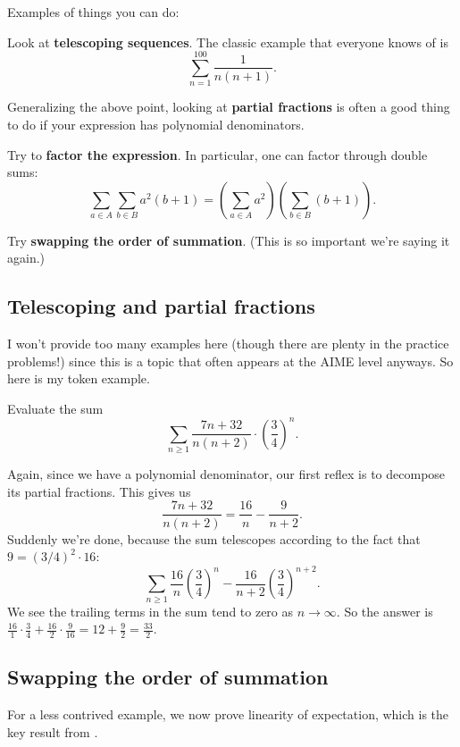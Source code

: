 \documentclass[11pt]{scrartcl}
\begin{document}
Examples of things you can do:
\begin{itemize}
  \ii Look at \textbf{telescoping sequences}.
  The classic example that everyone knows of is
  \[ \sum_{n=1}^{100} \frac{1}{n(n+1)}. \]

  \ii Generalizing the above point, looking at \textbf{partial fractions}
  is often a good thing to do if your expression has polynomial denominators.

  \ii Try to \textbf{factor the expression}.
  In particular, one can factor through double sums:
  \[ \sum_{a \in A} \sum_{b \in B} a^2(b+1)
    = \left( \sum_{a \in A} a^2 \right)
    \left( \sum_{b \in B} (b+1) \right). \]

  \ii Try \textbf{swapping the order of summation}.
  (This is so important we're saying it again.)
\end{itemize}

\subsection{Telescoping and partial fractions}
I won't provide too many examples here
(though there are plenty in the practice problems!)
since this is a topic that often appears at the AIME level anyways.
So here is my token example.
\begin{example}
  [Stanford 2011]
  Evaluate the sum \[ \sum_{n \ge 1} \frac{7n+32}{n(n+2)} \cdot \left( \frac 34 \right)^n. \]
\end{example}
\begin{soln}
  Again, since we have a polynomial denominator,
  our first reflex is to decompose its partial fractions. This gives us
  \[ \frac{7n+32}{n(n+2)} = \frac{16}{n} - \frac{9}{n+2}. \]
  Suddenly we're done, because the sum telescopes
  according to the fact that $9 = (3/4)^2 \cdot 16$:
  \[ \sum_{n \ge 1} \frac{16}{n} \left( \frac 34 \right)^n
    - \frac{16}{n+2} \left( \frac 34 \right)^{n+2} . \]
  We see the trailing terms in the sum tend to zero as $n \to \infty$.
  So the answer is $\frac{16}{1} \cdot \frac34 + \frac{16}{2} \cdot \frac{9}{16}
  = 12 + \frac{9}{2} = \frac{33}{2}$.
\end{soln}

\subsection{Swapping the order of summation}
For a less contrived example, we now prove linearity of expectation,
which is the key result from \cite{ref:EV}.
\end{document}
